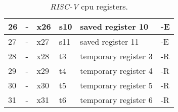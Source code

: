 \begin{table}[!ht]
\begin{tabular}{|l|l|l|l|l|l|}
  26                                                                      & -                                                                                   & x26               & s10               & saved register 10                                                               & -E                       \\ \hline
  27                                                                      & -                                                                                   & x27               & s11               & saved register 11                                                               & -E                       \\ \hline
  28                                                                      & -                                                                                   & x28               & t3                & temporary register 3                                                            & -R                       \\ \hline
  29                                                                      & -                                                                                   & x29               & t4                & temporary register 4                                                            & -R                       \\ \hline
  30                                                                      & -                                                                                   & x30               & t5                & temporary register 5                                                            & -R                       \\ \hline
  31                                                                      & -                                                                                   & x31               & t6                & temporary register 6                                                            & -R                       \\ \hline
  \end{tabular}
  \caption{\textit{RISC-V} \acrshort{cpu} registers.}
  \label{tab:riscv_cpu_registers}
\end{table}

